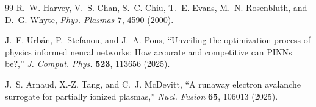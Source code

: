 \documentclass[11pt]{article}
\begin{document}
\begin{thebibliography}{99}
R.~W. Harvey, V.~S. Chan, S.~C. Chiu, T.~E. Evans,
M.~N. Rosenbluth, and D.~G. Whyte,
\emph{Phys. Plasmas} \textbf{7}, 4590 (2000).


J.~F. Urb{\'a}n, P.~Stefanou, and J.~A. Pons,
``Unveiling the optimization process of physics informed neural networks: How accurate and competitive can PINNs be?,''
\emph{J. Comput. Phys.} \textbf{523}, 113656 (2025).

J.~S. Arnaud, X.-Z. Tang, and C.~J. McDevitt,
``A runaway electron avalanche surrogate for partially ionized plasmas,''
\emph{Nucl. Fusion} \textbf{65}, 106013 (2025).

\end{thebibliography}
\end{document}
